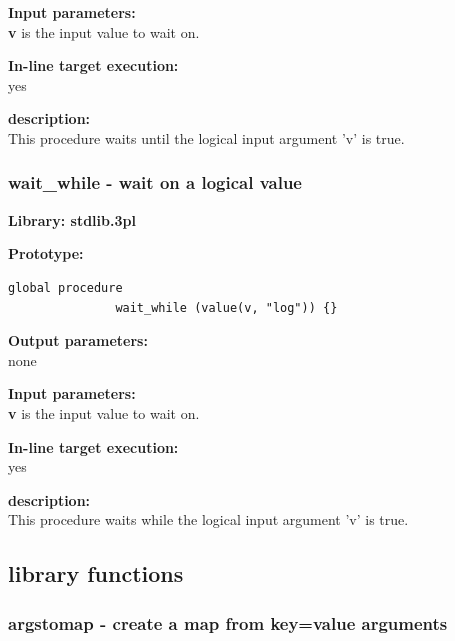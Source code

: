             {\bf Input parameters:} \\            
            {\bf v} is the input value to wait on.
        
            {\bf In-line target execution:} \\
            yes

            {\bf description:} \\
            This procedure waits until the logical input argument 'v' is
            true.


        \subsubsection{wait\_while - wait on a logical value}\label{sec:lpwaitwhile}

            {\bf Library: stdlib.3pl}

            {\bf Prototype:} \\
            \vsp
            \begin{lstlisting}[gobble=12, language=threepl]
               global procedure
               wait_while (value(v, "log")) {}
            \end{lstlisting}

            {\bf Output parameters:} \\
            none

            {\bf Input parameters:} \\            
            {\bf v} is the input value to wait on.
        
            {\bf In-line target execution:} \\
            yes

            {\bf description:} \\
            This procedure waits while the logical input argument 'v' is
            true.





    \subsection{library functions}




        \subsubsection{argstomap - create a map from key=value arguments}\label{sec:lfargstomap}

